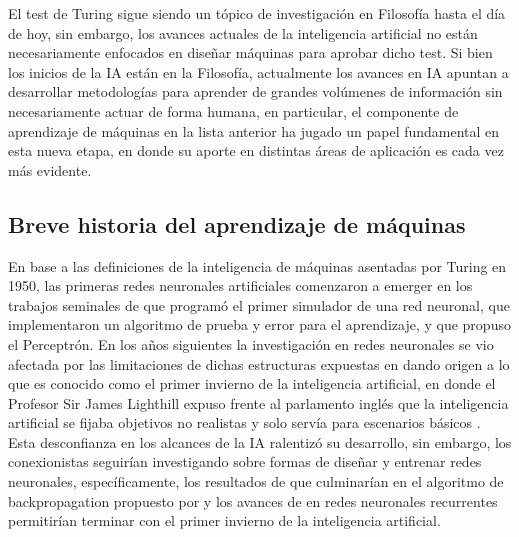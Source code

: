 El test de Turing sigue siendo un tópico de investigación en Filosofía hasta el día de hoy, sin embargo, los avances actuales de la inteligencia artificial no están necesariamente enfocados en diseñar máquinas para aprobar dicho test. Si bien los inicios de la IA están en la Filosofía, actualmente los avances en IA apuntan a desarrollar metodologías para aprender de grandes volúmenes de información sin necesariamente actuar de forma humana, en particular, el componente de aprendizaje de máquinas en la lista anterior ha jugado un papel fundamental en esta nueva etapa, en donde su aporte en distintas áreas de aplicación es cada vez más evidente. 


\subsection{Breve historia del aprendizaje de máquinas}

En base a las definiciones de la inteligencia de máquinas asentadas por Turing en 1950, las primeras redes neuronales artificiales comenzaron a emerger en los trabajos seminales de \cite{minsky_1952} que programó el primer simulador de una red neuronal, \cite{farley_1954} que implementaron un algoritmo de prueba y error para el aprendizaje, y \cite{rosenblatt_1958} que propuso el Perceptrón. En los años siguientes la investigación en redes neuronales se vio afectada por las limitaciones de dichas estructuras expuestas en \cite{minsky_papert_1969} dando origen a lo que es conocido como el primer invierno de la inteligencia artificial, en donde el Profesor Sir James Lighthill expuso frente al parlamento inglés que la inteligencia artificial se fijaba objetivos no realistas y solo servía para escenarios básicos \cite{lighthill_1973}. Esta desconfianza en los alcances de la IA ralentizó su desarrollo, sin embargo, los conexionistas  seguirían investigando sobre formas de diseñar y entrenar redes neuronales, específicamente, los resultados de \cite{werbos_1974} que culminarían en el algoritmo de backpropagation propuesto por \cite{rumelhart_1986} y los avances de  \cite{hopfield_1982} en redes neuronales recurrentes permitirían terminar con el primer invierno de la inteligencia artificial.  
 
